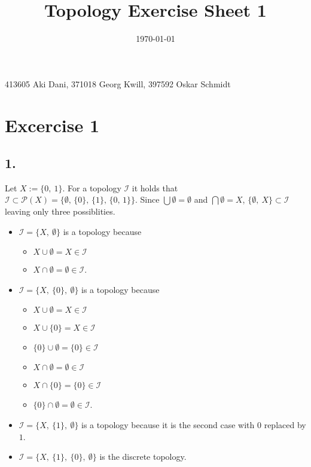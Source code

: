 \documentclass{article}
\title{Topology Exercise Sheet 1}
\date{\today}
\begin{document}
\maketitle

413605 Aki Dani, 371018 Georg Kwill, 397592 Oskar Schmidt

\section*{Excercise 1}
\label{sec:Ex1}
\subsection*{1.}
Let $X := \{0,\ 1\}$.
For a topology $\mathcal{I}$ it holds that $\mathcal{I} \subset{\mathcal{P}(X)} = \{ \emptyset ,\, \{0\} ,\, \{1\} ,\, \{0,\, 1\}\}$.
Since $\bigcup \emptyset = \emptyset$ and $\bigcap \emptyset = X$, $\{ \emptyset ,\ X \} \subset \mathcal{I}$ leaving only three possiblities.
\begin{itemize}
\item $\mathcal{I} = \{X ,\ \emptyset \}$ is a topology because
  \begin{itemize}
  \item $X \cup \emptyset = X \in \mathcal{I}$
  \item $X \cap \emptyset = \emptyset \in \mathcal{I}$.
  \end{itemize}
\item $\mathcal{I} = \{X ,\ \{0\} ,\ \emptyset\}$ is a topology because
  \begin{itemize}
  \item $X \cup \emptyset = X \in \mathcal{I}$
  \item $X \cup \{0\} = X \in \mathcal{I}$
  \item $\{0\} \cup \emptyset = \{0\} \in \mathcal{I}$
  \item $X \cap \emptyset = \emptyset \in \mathcal{I}$
  \item $X \cap \{0\} = \{0\} \in \mathcal{I}$
  \item $\{0\} \cap \emptyset = \emptyset \in \mathcal{I}$.
  \end{itemize}
\item $\mathcal{I} = \{X ,\ \{1\} ,\ \emptyset\}$ is a topology because it is the second case with $0$ replaced by $1$.
\item $\mathcal{I} = \{X ,\ \{1\} ,\ \{0\} ,\ \emptyset\}$ is the discrete topology.
\end{itemize}
\end{document}
